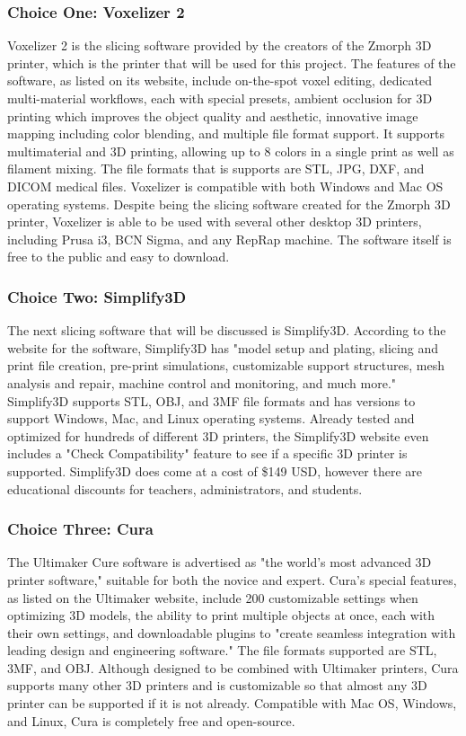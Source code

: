 \documentclass[letterpaper, onecolumn, draftclsnofoot, 10pt, compsoc]{IEEEtran}
\begin{document}
\begin{singlespace}
\subsubsection{Choice One: Voxelizer 2}
Voxelizer 2 is the slicing software provided by the creators of the Zmorph 3D printer, which is the printer that will be used for this project. 
The features of the software, as listed on its website, include on-the-spot voxel editing, dedicated multi-material workflows, each with special presets, ambient occlusion for 3D printing which improves the object quality and aesthetic, innovative image mapping including color blending, and multiple file format support. 
It supports multimaterial and 3D printing, allowing up to 8 colors in a single print as well as filament mixing.
The file formats that is supports are STL, JPG, DXF, and DICOM medical files. 
Voxelizer is compatible with both Windows and Mac OS operating systems. 
Despite being the slicing software created for the Zmorph 3D printer, Voxelizer is able to be used with several other desktop 3D printers, including Prusa i3, BCN Sigma, and any RepRap machine. 
The software itself is free to the public and easy to download. \cite{voxelweb}

\subsubsection{Choice Two: Simplify3D}
The next slicing software that will be discussed is Simplify3D.
According to the website for the software, Simplify3D has "model setup and plating, slicing and print file creation, pre-print simulations, customizable support structures, mesh analysis and repair, machine control and monitoring, and much more."
Simplify3D supports STL, OBJ, and 3MF file formats and has versions to support Windows, Mac, and Linux operating systems.
Already tested and optimized for hundreds of different 3D printers, the Simplify3D website even includes a "Check Compatibility" feature to see if a specific 3D printer is supported.
Simplify3D does come at a cost of \$149 USD, however there are educational discounts for teachers, administrators, and students. \cite{3dsweb}

\subsubsection{Choice Three: Cura}
The Ultimaker Cure software is advertised as "the world's most advanced 3D printer software," suitable for both the novice and expert. 
Cura's special features, as listed on the Ultimaker website, include 200 customizable settings when optimizing 3D models, the ability to print multiple objects at once, each with their own settings, and downloadable plugins to "create seamless integration with leading design and engineering software."
The file formats supported are STL, 3MF, and OBJ.
Although designed to be combined with Ultimaker printers, Cura supports many other 3D printers and is customizable so that almost any 3D printer can be supported if it is not already.
Compatible with Mac OS, Windows, and Linux, Cura is completely free and open-source. \cite{curaweb}


\end{singlespace}
\end{document}
